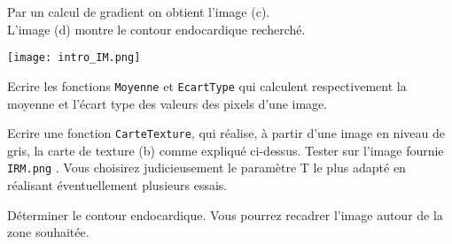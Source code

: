 Par un calcul de gradient on obtient l'image (c).\\
L'image (d) montre le contour endocardique recherché.

\begin{minipage}{1\textwidth}%
\texttt{[image: intro\_IM.png]}
\end{minipage}

\begin{question}
Ecrire les fonctions \texttt{Moyenne} et \texttt{EcartType} qui calculent respectivement la moyenne et l'écart type des valeurs des pixels d'une image. 
\end{question}

\begin{question}
Ecrire une fonction \texttt{CarteTexture}, qui réalise, à partir d'une image en niveau de gris, la carte de texture (b) comme expliqué ci-dessus. Tester sur l'image fournie \texttt{IRM.png} . Vous choisirez judicieusement le paramètre T le plus adapté en réalisant éventuellement plusieurs essais.   
\end{question}

\begin{question}
Déterminer le contour endocardique. Vous pourrez recadrer l'image autour de la zone souhaitée.
\end{question}





